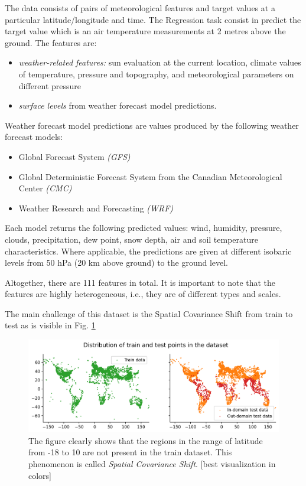 \documentclass[letterpaper, 10 pt, conference]{ieeeconf}
\begin{document}
    The data consists of pairs of meteorological features and target values at a particular latitude/longitude and time.
    The Regression task consist in predict the target value which is an air temperature measurements at 2 metres above the ground.
    The features are:
    \begin{itemize}
        \item \textit{weather-related features:} sun evaluation at the current location, climate values of temperature, pressure and topography, and meteorological parameters on different pressure
        \item \textit{surface levels} from weather forecast model predictions.
    \end{itemize} 
    Weather forecast model predictions are values produced by the following weather forecast models: 

    \begin{itemize}
        \item Global Forecast System \textit{(GFS)}
        \item Global Deterministic Forecast System from the Canadian Meteorological Center \textit{(CMC)}
        \item Weather Research and Forecasting \textit{(WRF) }
    \end{itemize}
    Each model returns the following predicted values: wind, humidity, pressure, clouds, precipitation, dew point, snow depth, air and soil temperature characteristics. Where applicable, the predictions are given at different isobaric levels from 50 hPa (20 km above ground) to the ground level.

    Altogether, there are 111 features in total. It is important to note that the features are highly heterogeneous, i.e., they are of different types and scales.

    The main challenge of this dataset is the Spatial Covariance Shift from train to test as is visible in Fig. \ref{fig:train-test-diff}

    \begin{figure}
        \centering
        \includegraphics[width=\linewidth]{challenge1/assets/train-test-diff.png}
        \caption{The figure clearly shows that the regions in the range of latitude from -18 to 10 are not present in the train dataset. This phenomenon is called \textit{Spatial Covariance Shift}. [best visualization in colors] }
        \label{fig:train-test-diff}
    \end{figure}
\end{document}
